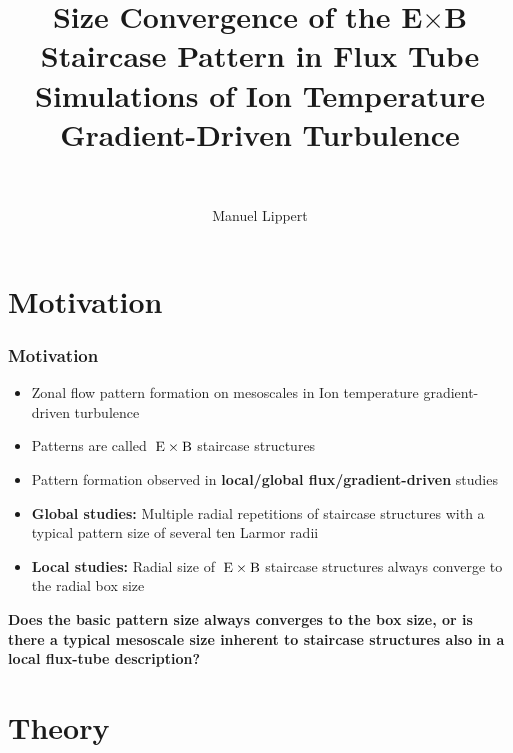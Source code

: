 \documentclass[compress,aspectratio=1610,noflama]{beamer}
\title{Size Convergence of the E$\times$B \\ Staircase Pattern in Flux Tube \\ Simulations of Ion
Temperature \\ Gradient-Driven Turbulence}
\subtitle{~}
\author{Manuel Lippert}
\institute{Theoretical Physics V}
\begin{document}
	\maketitle


	\section*{Motivation}
	\begin{frame}
		\frametitle{Motivation}

		\begin{center}
			\begin{itemize}
				\item <2-> Zonal flow pattern formation on mesoscales in Ion temperature gradient-driven turbulence 
				\item <3-> Patterns are called $\mathrm{\:E}\times\mathrm{B}$ staircase structures
				\item <4-> Pattern formation observed in \textbf{local/global flux/gradient-driven} studies
			\end{itemize}
		\end{center}
		\bigskip
		\begin{center}
			\begin{itemize}
				\item <5-> \textbf{Global studies:} Multiple radial repetitions of staircase structures with a typical pattern size of several ten Larmor radii
				\item <6-> \textbf{Local studies:} Radial size of $\mathrm{\:E}\times\mathrm{B}$ staircase structures always converge to the radial box size
			\end{itemize}
			\bigskip
			 \textbf{Does the basic pattern size always converges to the box size, or is there a typical mesoscale size inherent to staircase structures also in a local flux-tube description?}
		\end{center}
	\end{frame}

	\section*{Theory}
\end{document}
